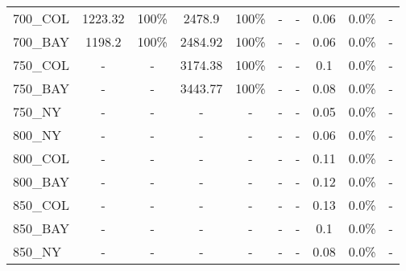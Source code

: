 \documentclass[main.tex]{subfiles}
\begin{document}
\begin{center}
\begin{tabular}{lccccccccc}
700\_COL & 1223.32 &  100\%  & 2478.9 &  100\%  & - & - 
 & 0.06 & 0.0\% & - \\
700\_BAY & 1198.2 &  100\%  & 2484.92 &  100\%  & - & - 
 & 0.06 & 0.0\% & - \\
750\_COL & - & - 
 & 3174.38 &  100\%  & - & - 
 & 0.1 & 0.0\% & - \\
750\_BAY & - & - 
 & 3443.77 &  100\%  & - & - 
 & 0.08 & 0.0\% & - \\
750\_NY & - & - 
 & - & - 
 & - & - 
 & 0.05 & 0.0\% & - \\
800\_NY & - & - 
 & - & - 
 & - & - 
 & 0.06 & 0.0\% & - \\
800\_COL & - & - 
 & - & - 
 & - & - 
 & 0.11 & 0.0\% & - \\
800\_BAY & - & - 
 & - & - 
 & - & - 
 & 0.12 & 0.0\% & - \\
850\_COL & - & - 
 & - & - 
 & - & - 
 & 0.13 & 0.0\% & - \\
850\_BAY & - & - 
 & - & - 
 & - & - 
 & 0.1 & 0.0\% & - \\
850\_NY & - & - 
 & - & - 
 & - & - 
 & 0.08 & 0.0\% & - \\
\hline\end{tabular}
\end{center}
\newpage
\end{document}
